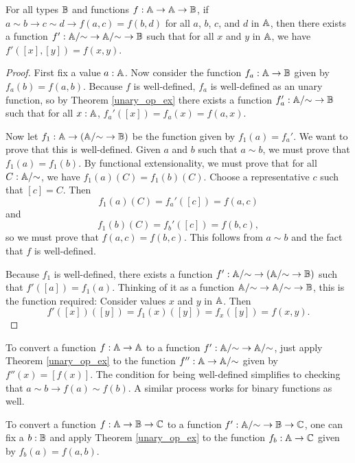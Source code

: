 \documentclass[../../math.tex]{subfiles}
\begin{document}
\begin{theorem} \label{binary_op_ex}
    For all types $\mathbb{B}$ and functions $f : \mathbb{A} \to \mathbb{A} \to \mathbb{B}$, if $a \sim b \to c
    \sim d \to f(a, c) = f(b, d)$ for all $a$, $b$, $c$, and $d$ in $\mathbb{A}$, then
    there exists a function $f' : \mathbb{A}/{\sim} \to \mathbb{A}/{\sim} \to \mathbb{B}$ such that for
    all $x$ and $y$ in $\mathbb{A}$, we have $f'([x], [y]) = f(x, y)$.
\end{theorem}
\begin{proof}
    First fix a value $a : \mathbb{A}$.  Now consider the function $f_a : \mathbb{A} \to \mathbb{B}$
    given by $f_a(b) = f(a, b)$.  Because $f$ is well-defined, $f_a$ is
    well-defined as an unary function, so by Theorem \ref{unary_op_ex} there
    exists a function $f_a' : \mathbb{A}/{\sim} \to \mathbb{B}$ such that for all $x : \mathbb{A}$,
    $f_a'([x]) = f_a(x) = f(a, x)$.

    Now let $f_1 : \mathbb{A} \to (\mathbb{A}/{\sim} \to \mathbb{B})$ be the function given by $f_1(a) =
    f_a'$.  We want to prove that this is well-defined.  Given $a$ and $b$ such
    that $a \sim b$, we must prove that $f_1(a) = f_1(b)$.  By functional
    extensionality, we must prove that for all $C : \mathbb{A}/{\sim}$, we have
    $f_1(a)(C) = f_1(b)(C)$.  Choose a representative $c$ such that $[c] = C$.
    Then
    \[
        f_1(a)(C) = f_a'([c]) = f(a, c)
    \]
    and
    \[
        f_1(b)(C) = f_b'([c]) = f(b, c),
    \]
    so we must prove that $f(a, c) = f(b, c)$.  This follows from $a \sim b$ and
    the fact that $f$ is well-defined.

    Because $f_1$ is well-defined, there exists a function $f' : \mathbb{A}/{\sim} \to
    (\mathbb{A}/{\sim} \to \mathbb{B})$ such that $f'([a]) = f_1(a)$.  Thinking of it as a
    function $\mathbb{A}/{\sim} \to \mathbb{A}/{\sim} \to \mathbb{B}$, this is the function required:
    Consider values $x$ and $y$ in $\mathbb{A}$.  Then
    \[
        f'([x])([y]) = f_1(x)([y]) = f_x([y]) = f(x, y).
    \]
\end{proof}

To convert a function $f : \mathbb{A} \to \mathbb{A}$ to a function $f' : \mathbb{A}/{\sim} \to
\mathbb{A}/{\sim}$, just apply Theorem \ref{unary_op_ex} to the function $f'' : \mathbb{A} \to
\mathbb{A}/{\sim}$ given by $f''(x) = [f(x)]$.  The condition for being well-defined
simplifies to checking that $a \sim b \to f(a) \sim f(b)$.  A similar process
works for binary functions as well.

To convert a function $f : \mathbb{A} \to \mathbb{B} \to \mathbb{C}$ to a function $f' : \mathbb{A}/{\sim} \to \mathbb{B}
\to \mathbb{C}$, one can fix a $b : \mathbb{B}$ and apply Theorem \ref{unary_op_ex} to the
function $f_b : \mathbb{A} \to \mathbb{C}$ given by $f_b(a) = f(a, b)$.
\end{document}
